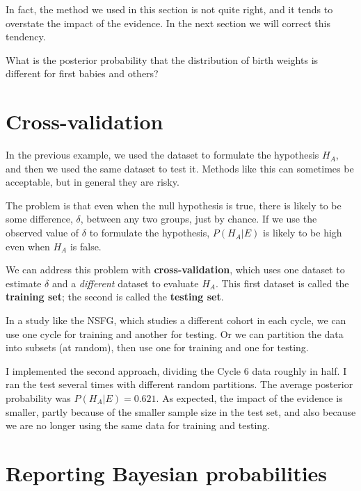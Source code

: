 \documentclass[12pt]{book}
\begin{document}
In fact, the method we used in this section is not quite right, and
it tends to overstate the impact of the evidence.  In the next section
we will correct this tendency.

\begin{ex}

What is the posterior probability that the distribution of birth
weights is different for first babies and others?

\end{ex}


\section{Cross-validation}

In the previous example, we used the dataset to formulate the
hypothesis $H_A$, and then we used the same dataset to test it.
Methods like this can sometimes be acceptable, but in general
they are risky.

The problem is that even when the null hypothesis is true, there is
likely to be some difference, $\delta$, between any two groups, just
by chance.  If we use the observed value of $\delta$ to formulate
the hypothesis, $P(H_A | E)$ is likely to be high even when $H_A$ is
false.

We can address this problem with {\bf cross-validation}, which uses
one dataset to estimate $\delta$ and a {\em different} dataset to
evaluate $H_A$.  This first dataset is called the {\bf training set};
the second is called the {\bf testing set}.

In a study like the NSFG, which studies a different cohort in each
cycle, we can use one cycle for training and another for testing.
Or we can partition the data into subsets (at random), then use
one for training and one for testing.

I implemented the second approach, dividing the Cycle 6 data roughly
in half.  I ran the test several times with different random partitions.
The average posterior probability was $P(H_A | E) = 0.621$.  As
expected, the impact of the evidence is smaller, partly because of
the smaller sample size in the test set, and also because we are
no longer using the same data for training and testing.



\section{Reporting Bayesian probabilities}
\end{document}
